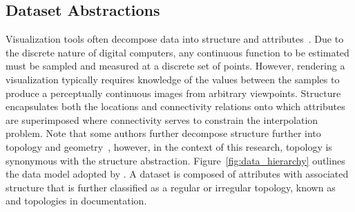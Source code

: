 \subsection{Dataset Abstractions}
Visualization tools often decompose data into structure and
attributes~\cite{vtk}. Due to the discrete nature of digital
computers, any continuous function to be estimated must be sampled and
measured at a discrete set of points. However, rendering a
visualization typically requires knowledge of the values between the
samples to produce a perceptually continuous images from arbitrary
viewpoints. Structure encapsulates both the locations and connectivity
relations onto which attributes are superimposed where connectivity
serves to constrain the interpolation problem. Note that some authors
further decompose structure further into topology and
geometry~\cite{weiler}, however, in the context of this research,
topology is synonymous with the structure
abstraction. Figure~\ref{fig:data_hierarchy} outlines the data model
adopted by \sciwms{}. A dataset is composed of attributes with
associated structure that is further classified as a regular or
irregular topology, known as \cgrid{} and \ugrid{} topologies in
\sciwms{} documentation.

